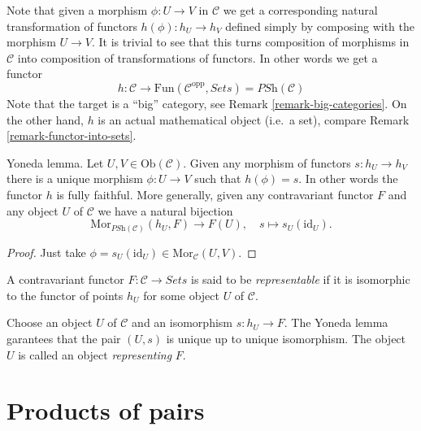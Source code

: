 \noindent
Note that given a morphism $\phi : U \to V$ in $\mathcal{C}$ we get a
corresponding natural transformation of functors
$h(\phi) : h_U \to h_V$ defined simply by composing with the morphism
$U \to V$. It is trivial to see that this turns
composition of morphisms in $\mathcal{C}$ into composition of
transformations of functors. In other words we get a functor
$$
h :
\mathcal{C}
\longrightarrow
\text{Fun}(\mathcal{C}^{\text{opp}}, \textit{Sets}) = \textit{PSh}(\mathcal{C})
$$
Note that the target is a ``big'' category, see
Remark \ref{remark-big-categories}. On the other hand,
$h$ is an actual mathematical object (i.e.\ a set), compare Remark
\ref{remark-functor-into-sets}.

\begin{lemma}
\label{lemma-yoneda}
Yoneda lemma.
Let $U, V \in \text{Ob}(\mathcal{C})$.
Given any morphism of functors $s : h_U \to h_V$
there is a unique morphism $\phi : U \to V$
such that $h(\phi) = s$. In other words the
functor $h$ is fully faithful. More generally,
given any contravariant functor $F$ and any object
$U$ of $\mathcal{C}$ we have a natural bijection
$$
\text{Mor}_{\textit{PSh}(\mathcal{C})}(h_U, F) \longrightarrow F(U),
\quad
s \longmapsto s_U(\text{id}_U).
$$
\end{lemma}

\begin{proof}
Just take $\phi = s_U(\text{id}_U) \in \text{Mor}_{\mathcal{C}}(U, V)$.
\end{proof}

\begin{definition}
\label{definition-representable-functor}
A contravariant functor $F : \mathcal{C}\to \textit{Sets}$ is said
to be {\it representable} if it is isomorphic to the functor of
points $h_U$ for some object $U$ of $\mathcal{C}$.
\end{definition}

\noindent
Choose an object $U$ of $\mathcal{C}$ and an isomorphism $s : h_U \to F$.
The Yoneda lemma garantees that the pair $(U, s)$
is unique up to unique isomorphism. The object
$U$ is called an object {\it representing} $F$.






\section{Products of pairs}
\label{section-products-pairs}


